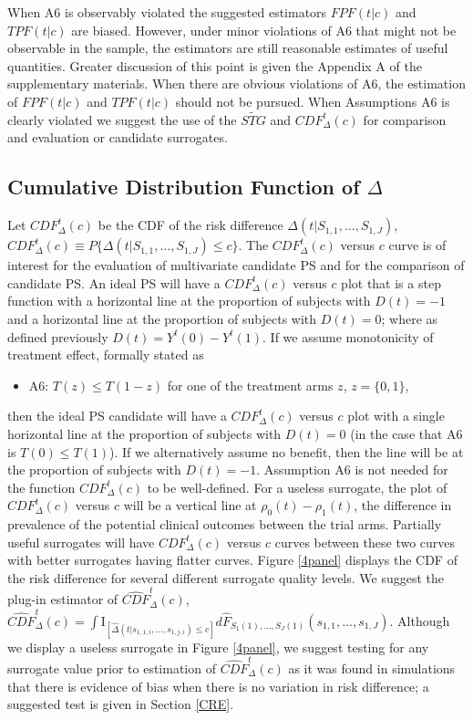 \documentclass[times, doublespace]{simauth}
\begin{document}
When A6 is observably violated the suggested estimators $FPF(t|c)$ and $TPF(t|c)$ are biased. However, under minor violations of A6 that might not be observable in the sample, the estimators are still reasonable estimates of useful quantities. Greater discussion of this point is given the Appendix A of the supplementary materials. When there are obvious violations of A6, the estimation of $FPF(t|c)$ and $TPF(t|c)$ should not be pursued. When Assumptions A6 is clearly violated we suggest the use of the $\widetilde{STG}$ and $CDF^{t}_{\Delta}(c)$ for comparison and evaluation or candidate surrogates.

\subsection{Cumulative Distribution Function of $\Delta$} \label{CDF}
 Let $CDF^{t}_{\Delta}(c)$ be the CDF of the risk difference $\Delta(t|S_{1,1}, \dots, S_{1,J})$, $CDF^{t}_{\Delta}(c)\equiv P\{\Delta(t|S_{1,1}, \dots, S_{1,J})\leq c\}.$ The $CDF^{t}_{\Delta}(c)$ versus $c$ curve is of interest for the evaluation of multivariate candidate PS and for the comparison of candidate PS. An ideal PS will have a $CDF^{t}_{\Delta}(c)$ versus $c$ plot that is a step function with a horizontal line at the proportion of subjects with $D(t)=-1$ and a horizontal line at the proportion of subjects with $D(t)=0$; where as defined previously $D(t)=Y^{t}(0)-Y^{t}(1)$. If we assume monotonicity of treatment effect, formally stated as
\begin{itemize}
\item A6: $T(z) \leq T(1-z)$ for one of the treatment arms $z$, $z=\{0,1\}$,
\end{itemize}
then the ideal PS candidate will have a $CDF^{t}_{\Delta}(c)$ versus $c$ plot with a single horizontal line at the proportion of subjects with $D(t)=0$ (in the case that A6 is $T(0) \leq T(1)$). If we alternatively assume no benefit, then the line will be at the proportion of subjects with $D(t)=-1$. Assumption A6 is not needed for the function $CDF^{t}_{\Delta}(c)$ to be well-defined. For a useless surrogate, the plot of $CDF^{t}_{\Delta}(c)$ versus $c$ will be a vertical line at $\rho_0(t)-\rho_1(t)$, the difference in prevalence of the potential clinical outcomes between the trial arms. Partially useful surrogates will have $CDF^{t}_{\Delta}(c)$ versus $c$ curves between these two curves with better surrogates having flatter curves. Figure \ref{4panel} displays the CDF of the risk difference for several different surrogate quality levels. We suggest the plug-in estimator of $\widehat{CDF}^{t}_{\Delta}(c)$, $\widehat{CDF}^{t}_{\Delta}(c)=\int{\mathrm{I}_{[\hat{\Delta}(t|s_{1,1,i}, \dots, s_{1,j,i})\leq c]} d\hat{F}_{S_1(1), \ldots, S_J(1)}(s_{1,1}, \dots, s_{1,J})}$. Although we display a useless surrogate in Figure \ref{4panel}, we suggest testing for any surrogate value prior to estimation of $\widehat{CDF}^{t}_{\Delta}(c)$ as it was found in simulations that there is evidence of bias when there is no variation in risk difference; a suggested test is given in Section \ref{CRE}.
\end{document}
